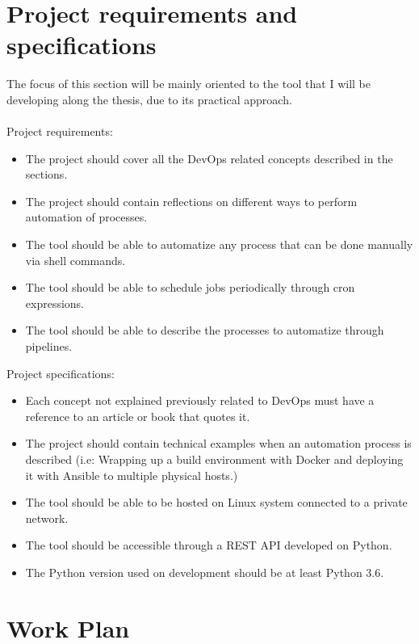 \documentclass[a4paper]{article}
\begin{document}
\section{Project requirements and specifications}

The focus of this section will be mainly oriented to the tool that I will be developing along the thesis, due to its practical approach.
\\~\\
Project requirements:
\begin{itemize}
	\item The project should cover all the DevOps related concepts described in the sections.
	\item The project should contain reflections on different ways to perform automation of processes.
	\item The tool should be able to automatize any process that can be done manually via shell commands.
	\item The tool should be able to schedule jobs periodically through cron expressions.
	\item The tool should be able to describe the processes to automatize through pipelines.
\end{itemize}
Project specifications:
\begin{itemize}
	\item Each concept not explained previously related to DevOps must have a reference to an article or book that quotes it.
	\item The project should contain technical examples when an automation process is described (i.e: Wrapping up a build environment with Docker and deploying it with Ansible to multiple physical hosts.)
	\item The tool should be able to be hosted on Linux system connected to a private network.
	\item The tool should be accessible through a REST API developed on Python.
	\item The Python version used on development should be at least Python 3.6.
	
\end{itemize}
\section{Work Plan}
\end{document}
